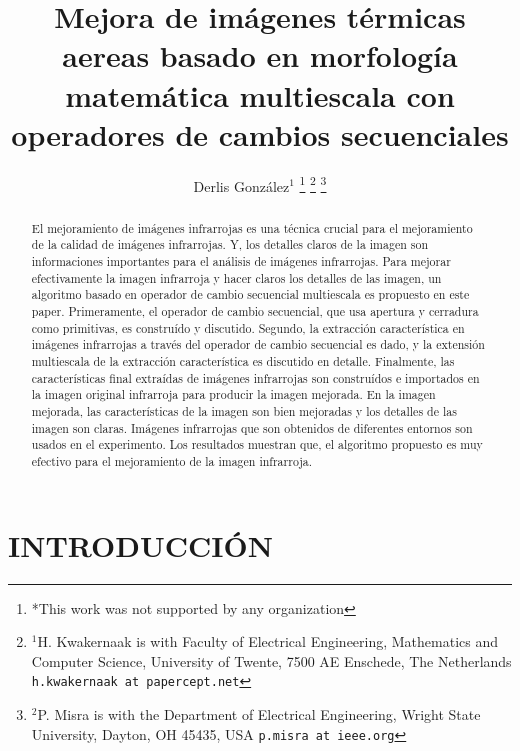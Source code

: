 \documentclass[a4paper, 11 pt, conference]{ieeeconf}      %
\title{\LARGE \bf
Mejora de im\'agenes t\'ermicas aereas basado en morfolog\'ia matem\'atica multiescala con operadores de cambios secuenciales
}
\author{Derlis Gonz\'alez$^{1}$ %
\thanks{*This work was not supported by any organization}%
\thanks{$^{1}$H. Kwakernaak is with Faculty of Electrical Engineering, Mathematics and Computer Science,
        University of Twente, 7500 AE Enschede, The Netherlands
        {\tt\small h.kwakernaak at papercept.net}}%
\thanks{$^{2}$P. Misra is with the Department of Electrical Engineering, Wright State University,
        Dayton, OH 45435, USA
        {\tt\small p.misra at ieee.org}}%
}
\begin{document}
\maketitle
\thispagestyle{empty}
\pagestyle{empty}


\begin{abstract}

El mejoramiento de im\'agenes infrarrojas es una t\'ecnica crucial para el mejoramiento de la calidad de im\'agenes infrarrojas. Y, los detalles claros de la imagen son informaciones importantes para el an\'alisis de im\'agenes infrarrojas. Para mejorar efectivamente la imagen infrarroja y hacer claros los detalles de las imagen, un algoritmo basado en operador de cambio secuencial multiescala es propuesto en este paper. Primeramente, el operador de cambio secuencial, que usa apertura y cerradura como primitivas, es constru\'ido y discutido. Segundo, la extracci\'on caracter\'istica en im\'agenes infrarrojas a trav\'es del operador de cambio secuencial es dado, y la extensi\'on multiescala de la extracci\'on caracter\'istica es discutido en detalle. Finalmente, las caracter\'isticas final extra\'idas de im\'agenes infrarrojas son constru\'idos e importados en la imagen original infrarroja para producir la imagen mejorada. En la imagen mejorada, las caracter\'isticas de la imagen son bien mejoradas y los detalles de las imagen son claras. Im\'agenes infrarrojas que son obtenidos de diferentes entornos son usados en el experimento. Los resultados muestran que, el algoritmo propuesto es muy efectivo para el mejoramiento de la imagen infrarroja.

\end{abstract}


\section{INTRODUCCI\'ON}
\end{document}
